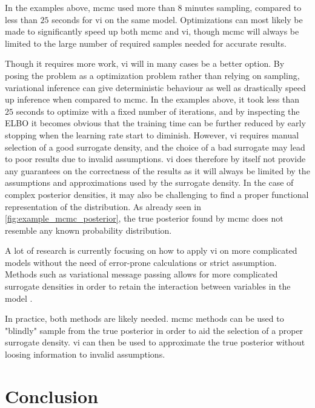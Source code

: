 In the examples above, \acrshort{mcmc} used more than $8$ minutes sampling, compared to less than $25$ seconds for \acrshort{vi} on the same model. Optimizations can most likely be made to significantly speed up both \acrshort{mcmc} and \acrshort{vi}, though \acrshort{mcmc} will always be limited to the large number of required samples needed for accurate results. 



Though it requires more work, \acrshort{vi} will in many cases be a better option. By posing the problem as a optimization problem rather than relying on sampling, variational inference can give deterministic behaviour as well as drastically speed up inference when compared to \acrshort{mcmc}. In the examples above, it took less than $25$ seconds to optimize with a fixed number of iterations, and by inspecting the ELBO it becomes obvious that the training time can be further reduced by early stopping when the learning rate start to diminish. 
However, \acrshort{vi} requires manual selection of a good surrogate density, and the choice of a bad surrogate may lead to poor results due to invalid assumptions. \acrshort{vi} does therefore by itself not provide any guarantees on the correctness of the results as it will always be limited by the assumptions and approximations used by the surrogate density. In the case of complex posterior densities, it may also be challenging to find a proper functional representation of the distribution. As already seen in \cref{fig:example_mcmc_posterior}, the true posterior found by \acrshort{mcmc} does not resemble any known probability distribution. 

A lot of research is currently focusing on how to apply \acrshort{vi} on more complicated models without the need of error-prone calculations or strict assumption. Methods such as variational message passing allows for more complicated surrogate densities in order to retain the interaction between variables in the model \cite{winnbishop}. 

In practice, both methods are likely needed. \acrshort{mcmc} methods can be used to "blindly" sample from the true posterior in order to aid the selection of a proper surrogate density. \acrshort{vi} can then be used to approximate the true posterior without loosing information to invalid assumptions. 

\section{Conclusion}

